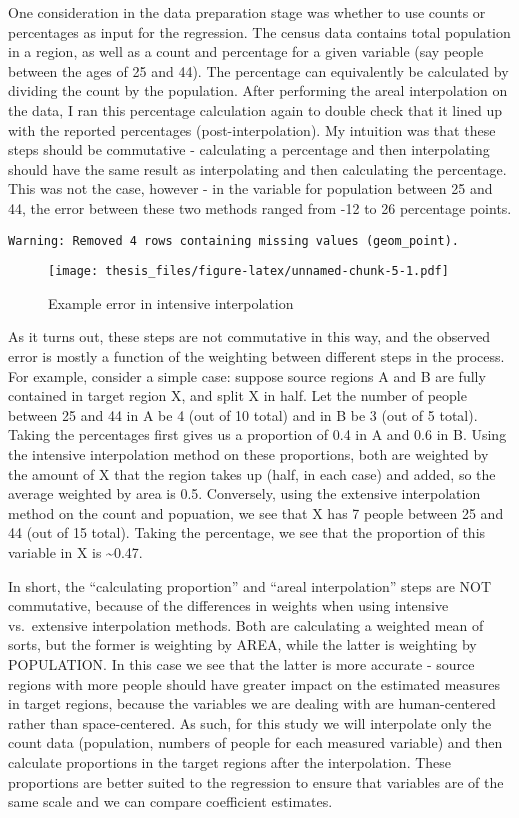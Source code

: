 \documentclass[12pt,twoside]{reedthesis}
\theoremstyle{definition}
\theoremstyle{definition}
\theoremstyle{definition}
\theoremstyle{remark}
\begin{document}
One consideration in the data preparation stage was whether to use
counts or percentages as input for the regression. The census data
contains total population in a region, as well as a count and percentage
for a given variable (say people between the ages of 25 and 44). The
percentage can equivalently be calculated by dividing the count by the
population. After performing the areal interpolation on the data, I ran
this percentage calculation again to double check that it lined up with
the reported percentages (post-interpolation). My intuition was that
these steps should be commutative - calculating a percentage and then
interpolating should have the same result as interpolating and then
calculating the percentage. This was not the case, however - in the
variable for population between 25 and 44, the error between these two
methods ranged from -12 to 26 percentage points.
\begin{verbatim}
Warning: Removed 4 rows containing missing values (geom_point).
\end{verbatim}
\begin{figure}
\centering
\texttt{[image: thesis\_files/figure-latex/unnamed-chunk-5-1.pdf]}
\caption{\label{fig:unnamed-chunk-5}Example error in intensive
interpolation}
\end{figure}
As it turns out, these steps are not commutative in this way, and the
observed error is mostly a function of the weighting between different
steps in the process. For example, consider a simple case: suppose
source regions A and B are fully contained in target region X, and split
X in half. Let the number of people between 25 and 44 in A be 4 (out of
10 total) and in B be 3 (out of 5 total). Taking the percentages first
gives us a proportion of 0.4 in A and 0.6 in B. Using the intensive
interpolation method on these proportions, both are weighted by the
amount of X that the region takes up (half, in each case) and added, so
the average weighted by area is 0.5. Conversely, using the extensive
interpolation method on the count and popuation, we see that X has 7
people between 25 and 44 (out of 15 total). Taking the percentage, we
see that the proportion of this variable in X is \textasciitilde{}0.47.

In short, the ``calculating proportion'' and ``areal interpolation''
steps are NOT commutative, because of the differences in weights when
using intensive vs.~extensive interpolation methods. Both are
calculating a weighted mean of sorts, but the former is weighting by
AREA, while the latter is weighting by POPULATION. In this case we see
that the latter is more accurate - source regions with more people
should have greater impact on the estimated measures in target regions,
because the variables we are dealing with are human-centered rather than
space-centered. As such, for this study we will interpolate only the
count data (population, numbers of people for each measured variable)
and then calculate proportions in the target regions after the
interpolation. These proportions are better suited to the regression to
ensure that variables are of the same scale and we can compare
coefficient estimates.
\end{document}
